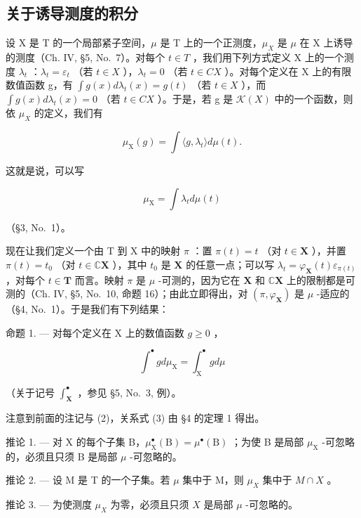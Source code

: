 \subsection{关于诱导测度的积分}

设 X 是 T 的一个局部紧子空间，\(\mu\) 是 T 上的一个正测度，\(\mu_{X}\) 是 \(\mu\) 在 X 上诱导的测度（Ch. IV, §5, No.~7）。对每个 \(t \in T\) ，我们用下列方式定义 X 上的一个测度 \(\lambda_{t}\) ：\(\lambda_{t} = \varepsilon_{t}\) （若 \(t \in X\) ），\(\lambda_{t} = 0\) （若 \(t \in C X\) ）。对每个定义在 X 上的有限数值函数 g，有 \(\int g(x) d\lambda_{t}(x) = g(t)\) （若 \(t \in X\) ），而 \(\int g(x) d\lambda_{t}(x) = 0\) （若 \(t \in C X\) ）。于是，若 g 是 \(\mathcal{K}(X)\) 中的一个函数，则依 \(\mu_{X}\) 的定义，我们有

\[
\mu_ {\mathrm{X}} (g) = \int \langle g, \lambda_ {t} \rangle d \mu (t).\tag{1}
\]

这就是说，可以写

\[
\mu_ {\mathrm{X}} = \int \lambda_ {t} d \mu (t)\tag{2}
\]

（§3, No.~1）。

现在让我们定义一个由 T 到 X 中的映射 \(\pi\) ：置 \(\pi(t) = t\) （对 \(t \in \mathbf{X}\) ），并置 \(\pi(t) = t_0\) （对 \(t \in \mathbb{C} \mathbf{X}\) ），其中 \(t_0\) 是 \(\mathbf{X}\) 的任意一点；可以写 \(\lambda_t = \varphi_{\mathbf{X}}(t) \varepsilon_{\pi(t)}\) ，对每个 \(t \in \mathbf{T}\) 而言。映射 \(\pi\) 是 \(\mu\) -可测的，因为它在 \(\mathbf{X}\) 和 \(\mathbb{C} \mathbf{X}\) 上的限制都是可测的（Ch. IV, §5, No.~10, 命题 16）；由此立即得出，对 \((\pi, \varphi_{\mathbf{X}})\) 是 \(\mu\) -适应的（§4, No.~1）。于是我们有下列结果：

命题 1. --- 对每个定义在 X 上的数值函数 \(g \geqslant 0\) ，

\[
\int^ {\bullet} g d \mu_ {\mathrm{X}} = \int_ {\mathrm{X}} ^ {\bullet} g d \mu\tag{3}
\]

（关于记号 \(\int_{\mathbf{X}}^{\bullet}\) ，参见 §5, No.~3, 例）。

注意到前面的注记与 (2)，关系式 (3) 由 §4 的定理 1 得出。

推论 1. --- 对 X 的每个子集 B，\(\mu_{\mathrm{X}}^{\bullet}(\mathrm{B}) = \mu^{\bullet}(\mathrm{B})\) ；为使 B 是局部 \(\mu_{\mathrm{X}}\) -可忽略的，必须且只须 B 是局部 \(\mu\) -可忽略的。

推论 2. --- 设 M 是 T 的一个子集。若 \(\mu\) 集中于 M，则 \(\mu_{X}\) 集中于 \(M \cap X\) 。

推论 3. --- 为使测度 \(\mu_{X}\) 为零，必须且只须 \(X\) 是局部 \(\mu\) -可忽略的。

